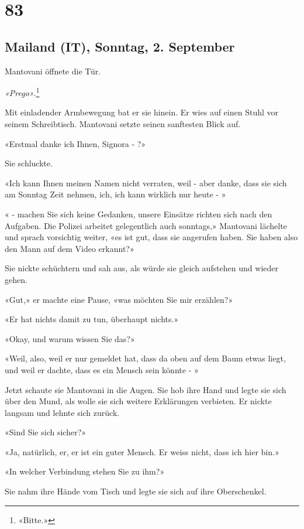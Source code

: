 \chapter{83}

\section{Mailand (IT), Sonntag, 2.
September}



Mantovani öffnete die Tür.

\emph{«Prego»}.\footnote{«Bitte.»}

Mit einladender Armbewegung bat er sie hinein. Er wies auf einen Stuhl
vor seinem Schreibtisch. 
Mantovani setzte seinen sanftesten Blick auf.

«Erstmal danke ich Ihnen, Signora - ?»

Sie schluckte.

«Ich kann Ihnen meinen Namen nicht verraten, weil - aber danke, dass sie sich am Sonntag Zeit nehmen, ich, ich kann wirklich nur heute - »

« - machen Sie sich keine Gedanken, unsere Einsätze richten sich nach den  Aufgaben. Die Polizei arbeitet gelegentlich auch sonntags,» Mantovani lächelte und sprach vorsichtig weiter, «es ist gut, dass sie angerufen haben. Sie haben also den Mann auf dem Video erkannt?»

Sie nickte schüchtern und sah aus, als würde sie gleich aufstehen und wieder gehen.

«Gut,» er machte eine Pause, «was möchten Sie mir erzählen?»

«Er hat nichts damit zu tun, überhaupt nichts.»

«Okay, und warum wissen Sie das?»

«Weil, also, weil er nur gemeldet hat, dass da oben auf dem Baum etwas
liegt, und weil er dachte, dass es ein Mensch sein könnte - »

Jetzt schaute sie Mantovani in die Augen. Sie hob ihre Hand und legte
sie sich über den Mund, als wolle sie sich weitere Erklärungen verbieten. 
Er nickte langsam und lehnte sich zurück.

«Sind Sie sich sicher?»

«Ja, natürlich, er, er ist ein guter Mensch. Er
weiss nicht, dass ich hier bin.»

«In welcher Verbindung stehen Sie zu ihm?»

Sie nahm ihre Hände vom Tisch und legte sie sich auf ihre Oberschenkel.

